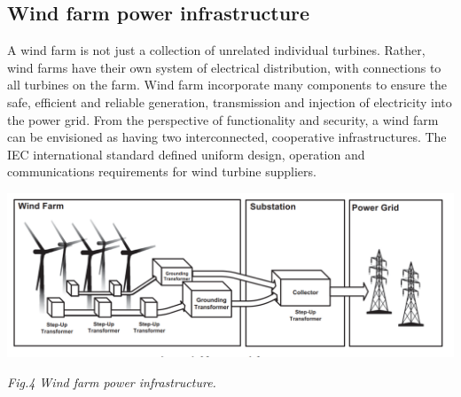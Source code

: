 \documentclass[twosided,a4,10pt]{article}
\begin{document}
\begin{multicols}{2}
 \subsection{Wind farm power infrastructure}
  A wind farm is not just a collection of unrelated individual turbines. Rather, wind farms have their own system of electrical distribution, with connections to all turbines on the farm. Wind farm incorporate many components to ensure the safe, efficient and reliable generation, transmission and injection of electricity into the power grid. From the perspective of functionality and security, a wind farm can be envisioned as having two interconnected, cooperative infrastructures. The IEC international standard defined uniform design, operation and communications requirements for wind turbine suppliers.

\end{multicols}
\includegraphics[scale =0.45]{windfarm_infra}
\begin{center}
	\textit{Fig.4 Wind farm power infrastructure.}
\end{center}
\end{document}
